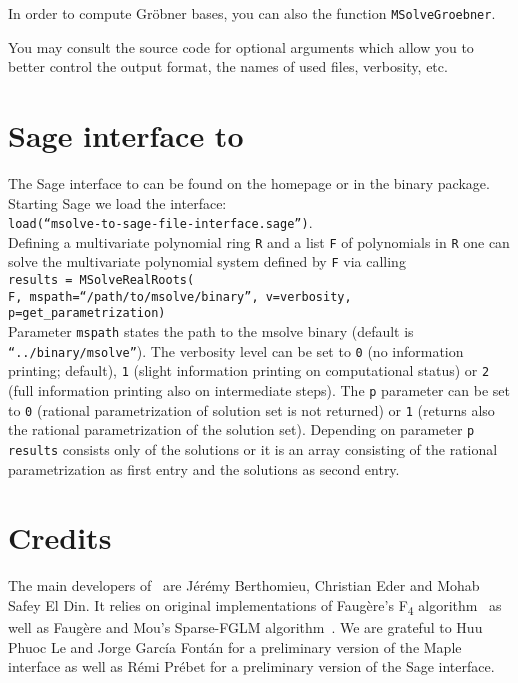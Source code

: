 \documentclass[a4paper,english,11pt]{scrartcl}
\theoremstyle{definition}
\theoremstyle{remark}
\newcommand\Fquatre{\textsc{\texorpdfstring{F\textsubscript{4}}{F4}}\xspace}
\begin{document}
In order to compute Gr\"obner bases, you can also the function
\texttt{MSolveGroebner}. 

You may consult the source code for optional arguments which allow you to better
control the output format, the names of used files, verbosity, etc.

\section{Sage interface to \msolve}
The Sage interface to \msolve can be found on the \msolve homepage or in the
\msolve binary package. Starting
Sage we load the interface:\\[1em]
\texttt{load(“msolve-to-sage-file-interface.sage”)}.\\[1em]
Defining a multivariate polynomial ring \texttt{R} and a list \texttt{F} of
polynomials in \texttt{R} one can solve the multivariate polynomial system
defined by \texttt{F} via calling\\[1em]
\texttt{results = MSolveRealRoots(}\\
\texttt{F, mspath=“/path/to/msolve/binary”,
v=verbosity, p=get\_parametrization)}\\[1em]
Parameter \texttt{mspath} states the path to the msolve binary (default is
\texttt{“../binary/msolve”}).
The verbosity level can be set to \texttt{0} (no information printing; default),
\texttt{1} (slight information printing on computational status) or \texttt{2}
(full information printing also on intermediate steps).
The \texttt{p} parameter can be set to \texttt{0} (rational parametrization of
solution set is not returned) or \texttt{1} (returns also the rational
parametrization of the solution set). Depending on parameter \texttt{p}
\texttt{results} consists only of the solutions or it is an array consisting of
the rational parametrization as first entry and the solutions as second entry.
\section{Credits}

The main developers of \msolve~are J\'er\'emy Berthomieu, Christian Eder and
Mohab Safey El Din. It relies on original implementations of Faugère's \Fquatre
algorithm~\cite{F4} as well as Faug\`ere and Mou's Sparse-FGLM
algorithm~\cite{SparseFGLM}. We are grateful to Huu Phuoc Le and Jorge
García Fontán for a 
preliminary version of the Maple interface as well as Rémi Prébet for a
preliminary version of the Sage interface.  

\renewcommand*{\bibfont}{\small}
  \printbibliography
\end{document}

